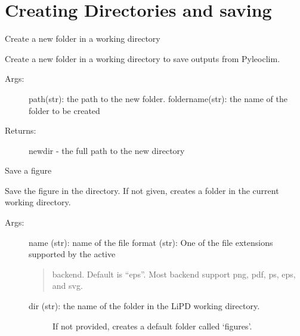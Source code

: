 \documentclass[letterpaper,10pt,english]{sphinxmanual}
\begin{document}
\section{Creating Directories and saving}
\label{\detokenize{LIPDutils:creating-directories-and-saving}}

\begin{fulllineitems}
\label{\detokenize{LIPDutils:pyleoclim.LipdUtils.createDir}}
Create a new folder in a working directory

Create a new folder in a working directory to save outputs from Pyleoclim.
\begin{description}
\item[{Args:}] \leavevmode
path(str): the path to the new folder.
foldername(str): the name of the folder to be created

\item[{Returns:}] \leavevmode
newdir - the full path to the new directory

\end{description}

\end{fulllineitems}


\begin{fulllineitems}
\label{\detokenize{LIPDutils:pyleoclim.LipdUtils.saveFigure}}
Save a figure

Save the figure in the directory. If not given, creates a folder in the 
current working directory.
\begin{description}
\item[{Args:}] \leavevmode
name (str): name of the file
format (str): One of the file extensions supported by the active
\begin{quote}

backend. Default is “eps”. Most backend support png, pdf, ps, eps,
and svg.
\end{quote}
\begin{description}
\item[{dir (str): the name of the folder in the LiPD working directory.}] \leavevmode
If not provided, creates a default folder called ‘figures’.

\end{description}

\end{description}

\end{fulllineitems}
\end{document}
